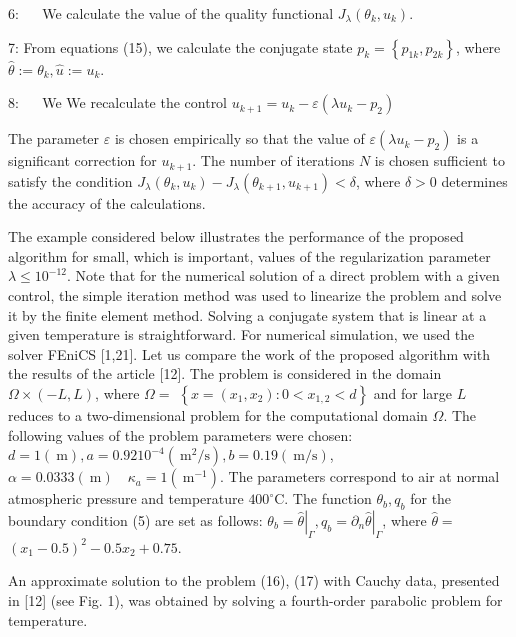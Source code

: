\documentclass[10pt]{article}
\begin{document}
6: $\quad$ We calculate the value of the quality functional $J_{\lambda}\left(\theta_{k}, u_{k}\right)$.

7: From equations (15), we calculate the conjugate state $p_{k}=\left\{p_{1 k}, p_{2 k}\right\}$, where $\widehat{\theta}:=\theta_{k}, \widehat{u}:=u_{k}$.

8: $\quad$ We We recalculate the control $u_{k+1}=u_{k}-\varepsilon\left(\lambda u_{k}-p_{2}\right)$

The parameter $\varepsilon$ is chosen empirically so that the value of $\varepsilon\left(\lambda u_{k}-p_{2}\right)$ is a significant correction for $u_{k+1}$. The number of iterations $N$ is chosen sufficient to satisfy the condition $J_{\lambda}\left(\theta_{k}, u_{k}\right)-J_{\lambda}\left(\theta_{k+1}, u_{k+1}\right)<\delta$, where $\delta>0$ determines the accuracy of the calculations.

The example considered below illustrates the performance of the proposed algorithm for small, which is important, values of the regularization parameter $\lambda \leq 10^{-12}$. Note that for the numerical solution of a direct problem with a given control, the simple iteration method was used to linearize the problem and solve it by the finite element method. Solving a conjugate system that is linear at a given temperature is straightforward. For numerical simulation, we used the solver FEniCS [1,21]. Let us compare the work of the proposed algorithm with the results of the article [12]. The problem is considered in the domain $\Omega \times(-L, L)$, where $\Omega=$ $\left\{x=\left(x_{1}, x_{2}\right): 0<x_{1,2}<d\right\}$ and for large $L$ reduces to a two-dimensional problem for the computational domain $\Omega$. The following values of the problem parameters were chosen: $d=1(\mathrm{~m}), a=0.9210^{-4}\left(\mathrm{~m}^{2} / \mathrm{s}\right), b=0.19(\mathrm{~m} / \mathrm{s})$, $\alpha=0.0333(\mathrm{~m}) \quad \kappa_{a}=1\left(\mathrm{~m}^{-1}\right)$. The parameters correspond to air at normal atmospheric pressure and temperature $400^{\circ} \mathrm{C}$. The function $\theta_{b}, q_{b}$ for the boundary condition (5) are set as follows: $\theta_{b}=\left.\widehat{\theta}\right|_{\Gamma}, q_{b}=\left.\partial_{n} \widehat{\theta}\right|_{\Gamma}$, where $\widehat{\theta}=$ $\left(x_{1}-0.5\right)^{2}-0.5 x_{2}+0.75$.

An approximate solution to the problem (16), (17) with Cauchy data, presented in [12] (see Fig. 1), was obtained by solving a fourth-order parabolic problem for temperature.
\end{document}
